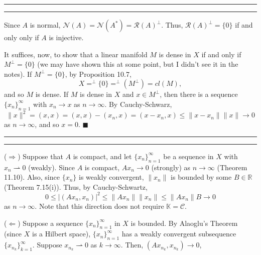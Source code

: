 \documentclass[11pt]{article}
\newcounter{questionCounter}
\newcounter{partCounter}[questionCounter]
\newenvironment{question}[2][\arabic{questionCounter}]{%
    \setcounter{partCounter}{0}%
    \vspace{.25in} \hrule \vspace{0.5em}%
        \noindent{\bf #2}%
    \vspace{0.8em} \hrule \vspace{.10in}%
    \addtocounter{questionCounter}{1}%
}{}
\renewcommand{\qed}{\quad \ensuremath{\blacksquare}}
\newcommand{\R}{\mathbb{R}} %
\newcommand{\C}{\mathcal{C}} %
\newcommand{\K}{\mathbb{K}} %
\newcommand{\Ran}{\mathcal{R}} %
\newcommand{\Nul}{\mathcal{N}} %
\newcommand{\wto}{\rightharpoonup} %
\begin{document}
\begin{question}{Problem 4}
Since $A$ is normal, $\Nul(A) = \Nul(A^*) = \Ran(A)^\perp$.
Thus, $\Ran(A)^\perp = \{0\}$ if and only only if $A$ is injective.

It suffices, now, to show that a linear manifold $M$ is dense in $X$ if
and only if $M^\perp = \{0\}$ (we may have shown this at some point, but I
didn't see it in the notes). If $M^\perp = \{0\}$, by Proposition
10.7, \[X = ^\perp\{0\} = ^\perp(M^\perp) = cl(M),\]
and so $M$ is dense. If $M$ is dense in $X$ and $x \in M^\perp$, then there is
a sequence $\{x_n\}_{n = 1}^\infty$ with $x_n \to x$ as $n \to \infty$. By
Cauchy-Schwarz,
\[\|x\|^2
    = ( x, x       ) 
    = ( x, x       )  - ( x_n, x )
    = ( x - x_n, x ) 
    \leq \|x - x_n\|\|x\| \to 0
\]
as $n \to \infty$, and so $x = 0$. \qed
\end{question}

\begin{question}{Problem 5}
($\Rightarrow$) Suppose that $A$ is compact, and let $\{x_n\}_{n = 1}^\infty$
be a sequence in $X$ with $x_n \wto 0$ (weakly). Since $A$ is compact,
$Ax_n \to 0$ (strongly) as $n \to \infty$ (Theorem 11.10).
Also, since $\{x_n\}$ is weakly convergent, $\|x_n\|$ is bounded by some
$B \in \R$ (Theorem 7.15(i)). Thus, by Cauchy-Schwartz,
\[0 \leq |(Ax_n,x_n)|^2 \leq \|Ax_n\|\|x_n\| \leq \|Ax_n\|B \to 0\]
as $n \to \infty$. Note that this direction does not require $\K = \C$.

($\Leftarrow$) Suppose a sequence $\{x_n\}_{n = 1}^\infty$ in $X$ is bounded.
By Alaoglu's Theorem (since $X$ is a Hilbert space), $\{x_n\}_{n = 1}^\infty$
has a weakly convergent subsequence $\{x_{n_k}\}_{k = 1}^\infty$. Suppose
$x_{n_k} \wto 0$ as $k \to \infty$. Then, $(Ax_{n_k},x_{n_k}) \to 0$,
\end{question}
\end{document}
